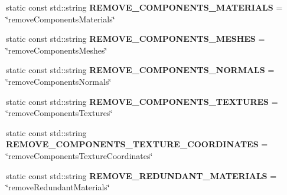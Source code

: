 \begin{DoxyCompactItemize}
\item 
\hypertarget{classrepo_1_1manipulator_1_1modelconvertor_1_1_model_import_config_abade5c555654ac7ad7866b607fe985ca}{}static const std\+::string {\bfseries R\+E\+M\+O\+V\+E\+\_\+\+C\+O\+M\+P\+O\+N\+E\+N\+T\+S\+\_\+\+M\+A\+T\+E\+R\+I\+A\+L\+S} = \char`\"{}remove\+Components\+Materials\char`\"{}\label{classrepo_1_1manipulator_1_1modelconvertor_1_1_model_import_config_abade5c555654ac7ad7866b607fe985ca}

\item 
\hypertarget{classrepo_1_1manipulator_1_1modelconvertor_1_1_model_import_config_a111eaba9f952d9dd17c258714804b51e}{}static const std\+::string {\bfseries R\+E\+M\+O\+V\+E\+\_\+\+C\+O\+M\+P\+O\+N\+E\+N\+T\+S\+\_\+\+M\+E\+S\+H\+E\+S} = \char`\"{}remove\+Components\+Meshes\char`\"{}\label{classrepo_1_1manipulator_1_1modelconvertor_1_1_model_import_config_a111eaba9f952d9dd17c258714804b51e}

\item 
\hypertarget{classrepo_1_1manipulator_1_1modelconvertor_1_1_model_import_config_a98569e123fd241d1499c41639363e7e8}{}static const std\+::string {\bfseries R\+E\+M\+O\+V\+E\+\_\+\+C\+O\+M\+P\+O\+N\+E\+N\+T\+S\+\_\+\+N\+O\+R\+M\+A\+L\+S} = \char`\"{}remove\+Components\+Normals\char`\"{}\label{classrepo_1_1manipulator_1_1modelconvertor_1_1_model_import_config_a98569e123fd241d1499c41639363e7e8}

\item 
\hypertarget{classrepo_1_1manipulator_1_1modelconvertor_1_1_model_import_config_a53b9d9ce14b3d8aa3b55afb8dc7764d3}{}static const std\+::string {\bfseries R\+E\+M\+O\+V\+E\+\_\+\+C\+O\+M\+P\+O\+N\+E\+N\+T\+S\+\_\+\+T\+E\+X\+T\+U\+R\+E\+S} = \char`\"{}remove\+Components\+Textures\char`\"{}\label{classrepo_1_1manipulator_1_1modelconvertor_1_1_model_import_config_a53b9d9ce14b3d8aa3b55afb8dc7764d3}

\item 
\hypertarget{classrepo_1_1manipulator_1_1modelconvertor_1_1_model_import_config_a8116eec9f891876eca43261dc26ea230}{}static const std\+::string {\bfseries R\+E\+M\+O\+V\+E\+\_\+\+C\+O\+M\+P\+O\+N\+E\+N\+T\+S\+\_\+\+T\+E\+X\+T\+U\+R\+E\+\_\+\+C\+O\+O\+R\+D\+I\+N\+A\+T\+E\+S} = \char`\"{}remove\+Components\+Texture\+Coordinates\char`\"{}\label{classrepo_1_1manipulator_1_1modelconvertor_1_1_model_import_config_a8116eec9f891876eca43261dc26ea230}

\item 
\hypertarget{classrepo_1_1manipulator_1_1modelconvertor_1_1_model_import_config_ac820adb9ac0ca35bcd68aae0d3c2f5c6}{}static const std\+::string {\bfseries R\+E\+M\+O\+V\+E\+\_\+\+R\+E\+D\+U\+N\+D\+A\+N\+T\+\_\+\+M\+A\+T\+E\+R\+I\+A\+L\+S} = \char`\"{}remove\+Redundant\+Materials\char`\"{}\label{classrepo_1_1manipulator_1_1modelconvertor_1_1_model_import_config_ac820adb9ac0ca35bcd68aae0d3c2f5c6}


\end{DoxyCompactItemize}
